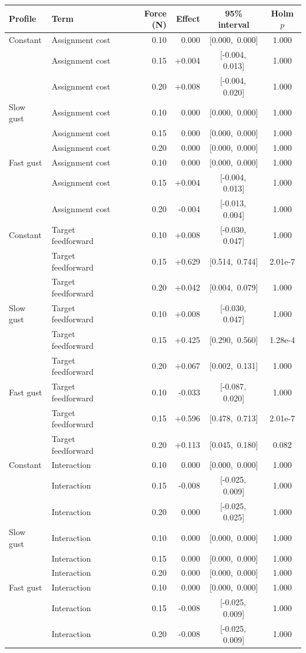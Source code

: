 \begin{tabular}{llrrcc}
\toprule
Profile & Term & Force (N) & Effect & 95\% interval & Holm $p$ \\
\midrule
Constant & Assignment cost & 0.10 & 0.000 & [0.000,\, 0.000] & 1.000 \\
 & Assignment cost & 0.15 & +0.004 & [-0.004,\, 0.013] & 1.000 \\
 & Assignment cost & 0.20 & +0.008 & [-0.004,\, 0.020] & 1.000 \\
Slow gust & Assignment cost & 0.10 & 0.000 & [0.000,\, 0.000] & 1.000 \\
 & Assignment cost & 0.15 & 0.000 & [0.000,\, 0.000] & 1.000 \\
 & Assignment cost & 0.20 & 0.000 & [0.000,\, 0.000] & 1.000 \\
Fast gust & Assignment cost & 0.10 & 0.000 & [0.000,\, 0.000] & 1.000 \\
 & Assignment cost & 0.15 & +0.004 & [-0.004,\, 0.013] & 1.000 \\
 & Assignment cost & 0.20 & -0.004 & [-0.013,\, 0.004] & 1.000 \\
Constant & Target feedforward & 0.10 & +0.008 & [-0.030,\, 0.047] & 1.000 \\
 & Target feedforward & 0.15 & +0.629 & [0.514,\, 0.744] & 2.01e-7 \\
 & Target feedforward & 0.20 & +0.042 & [0.004,\, 0.079] & 1.000 \\
Slow gust & Target feedforward & 0.10 & +0.008 & [-0.030,\, 0.047] & 1.000 \\
 & Target feedforward & 0.15 & +0.425 & [0.290,\, 0.560] & 1.28e-4 \\
 & Target feedforward & 0.20 & +0.067 & [0.002,\, 0.131] & 1.000 \\
Fast gust & Target feedforward & 0.10 & -0.033 & [-0.087,\, 0.020] & 1.000 \\
 & Target feedforward & 0.15 & +0.596 & [0.478,\, 0.713] & 2.01e-7 \\
 & Target feedforward & 0.20 & +0.113 & [0.045,\, 0.180] & 0.082 \\
Constant & Interaction & 0.10 & 0.000 & [0.000,\, 0.000] & 1.000 \\
 & Interaction & 0.15 & -0.008 & [-0.025,\, 0.009] & 1.000 \\
 & Interaction & 0.20 & 0.000 & [-0.025,\, 0.025] & 1.000 \\
Slow gust & Interaction & 0.10 & 0.000 & [0.000,\, 0.000] & 1.000 \\
 & Interaction & 0.15 & 0.000 & [0.000,\, 0.000] & 1.000 \\
 & Interaction & 0.20 & 0.000 & [0.000,\, 0.000] & 1.000 \\
Fast gust & Interaction & 0.10 & 0.000 & [0.000,\, 0.000] & 1.000 \\
 & Interaction & 0.15 & -0.008 & [-0.025,\, 0.009] & 1.000 \\
 & Interaction & 0.20 & -0.008 & [-0.025,\, 0.009] & 1.000 \\
\bottomrule
\end{tabular}
